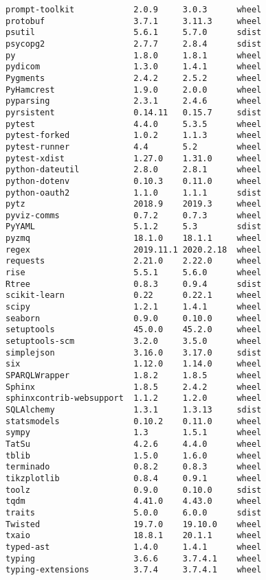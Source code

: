 \begin{verbatim}
prompt-toolkit            2.0.9     3.0.3      wheel
protobuf                  3.7.1     3.11.3     wheel
psutil                    5.6.1     5.7.0      sdist
psycopg2                  2.7.7     2.8.4      sdist
py                        1.8.0     1.8.1      wheel
pydicom                   1.3.0     1.4.1      wheel
Pygments                  2.4.2     2.5.2      wheel
PyHamcrest                1.9.0     2.0.0      wheel
pyparsing                 2.3.1     2.4.6      wheel
pyrsistent                0.14.11   0.15.7     sdist
pytest                    4.4.0     5.3.5      wheel
pytest-forked             1.0.2     1.1.3      wheel
pytest-runner             4.4       5.2        wheel
pytest-xdist              1.27.0    1.31.0     wheel
python-dateutil           2.8.0     2.8.1      wheel
python-dotenv             0.10.3    0.11.0     wheel
python-oauth2             1.1.0     1.1.1      sdist
pytz                      2018.9    2019.3     wheel
pyviz-comms               0.7.2     0.7.3      wheel
PyYAML                    5.1.2     5.3        sdist
pyzmq                     18.1.0    18.1.1     wheel
regex                     2019.11.1 2020.2.18  wheel
requests                  2.21.0    2.22.0     wheel
rise                      5.5.1     5.6.0      wheel
Rtree                     0.8.3     0.9.4      sdist
scikit-learn              0.22      0.22.1     wheel
scipy                     1.2.1     1.4.1      wheel
seaborn                   0.9.0     0.10.0     wheel
setuptools                45.0.0    45.2.0     wheel
setuptools-scm            3.2.0     3.5.0      wheel
simplejson                3.16.0    3.17.0     sdist
six                       1.12.0    1.14.0     wheel
SPARQLWrapper             1.8.2     1.8.5      wheel
Sphinx                    1.8.5     2.4.2      wheel
sphinxcontrib-websupport  1.1.2     1.2.0      wheel
SQLAlchemy                1.3.1     1.3.13     sdist
statsmodels               0.10.2    0.11.0     wheel
sympy                     1.3       1.5.1      wheel
TatSu                     4.2.6     4.4.0      wheel
tblib                     1.5.0     1.6.0      wheel
terminado                 0.8.2     0.8.3      wheel
tikzplotlib               0.8.4     0.9.1      wheel
toolz                     0.9.0     0.10.0     sdist
tqdm                      4.41.0    4.43.0     wheel
traits                    5.0.0     6.0.0      sdist
Twisted                   19.7.0    19.10.0    wheel
txaio                     18.8.1    20.1.1     wheel
typed-ast                 1.4.0     1.4.1      wheel
typing                    3.6.6     3.7.4.1    wheel
typing-extensions         3.7.4     3.7.4.1    wheel

\end{verbatim}
